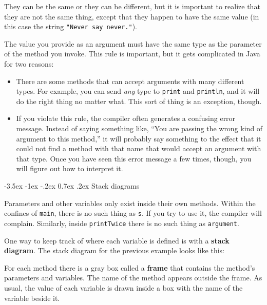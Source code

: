 \documentclass{book}
\makeatletter
\renewcommand{\section}{\@startsection 
    {section} {1} {0mm}%
    {-3.5ex \@plus -1ex \@minus -.2ex}%
    {0.7ex \@plus.2ex}%
    {\normalfont\Large\bfseries}}
\newcommand{\beforefig}{\vspace{1.3\parskip}}
\newcommand{\afterfig}{\vspace{-0.2\parskip}}
\newcommand{\myfig}[1]{
    \beforefig
    \centerline{\epsfig{#1,scale=0.8}}
    \afterfig
}
\makeatother
\begin{document}
They can be the same or they can be different, but it is important
to realize that they are not the same thing, except that they happen
to have the same value (in this case the string {\tt "Never say never."}).

The value you provide as an argument must have the same type as
the parameter of the method you invoke.  This rule is
important, but it gets complicated in Java for two reasons:

\begin {itemize}

\item There are some methods that can accept arguments with many
different types.  For example, you can send {\em any} type to
{\tt print} and {\tt println}, and it will do the right thing
no matter what.  This sort of thing is an exception, though.

\item If you violate this rule, the compiler often generates
a confusing error message.  Instead of saying something like,
``You are passing the wrong kind of argument to this method,''
it will probably say something to the effect that it could
not find a method with that name that would accept an argument
with that type.  Once you have seen this error message a few
times, though, you will figure out how to interpret it.

\end{itemize}


\section {Stack diagrams}
\label{stack}

Parameters and other
variables only exist inside their own methods.  Within the
confines of {\tt main}, there is no such thing as {\tt s}.
If you try to use it, the compiler will complain.  Similarly,
inside {\tt printTwice} there is no such thing as {\tt argument}.

One way to keep track of where each variable is defined is
with a {\bf stack diagram}.  The stack diagram for the previous
example looks like this:

\myfig{figure=figs/stack.eps}

For each method there is a gray box called a {\bf frame} that contains
the method's parameters and variables.  The name of the method
appears outside the frame.  As usual, the value of each variable
is drawn inside a box with the name of the variable beside it.
\end{document}
